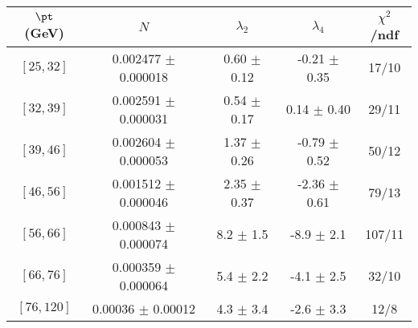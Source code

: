 \begin{tabular}{c||c|c|c|c}
$\pt$ (GeV) & $N$ & $\lambda_{2}$ & $\lambda_4$  & $\chi^2$/ndf  \\
\hline
$[25, 32]$ & 0.002477 $\pm$ 0.000018 & 0.60 $\pm$ 0.12 & -0.21 $\pm$ 0.35 & 17/10\\
$[32, 39]$ & 0.002591 $\pm$ 0.000031 & 0.54 $\pm$ 0.17 & 0.14 $\pm$ 0.40 & 29/11\\
$[39, 46]$ & 0.002604 $\pm$ 0.000053 & 1.37 $\pm$ 0.26 & -0.79 $\pm$ 0.52 & 50/12\\
$[46, 56]$ & 0.001512 $\pm$ 0.000046 & 2.35 $\pm$ 0.37 & -2.36 $\pm$ 0.61 & 79/13\\
$[56, 66]$ & 0.000843 $\pm$ 0.000074 & 8.2 $\pm$ 1.5 & -8.9 $\pm$ 2.1 & 107/11\\
$[66, 76]$ & 0.000359 $\pm$ 0.000064 & 5.4 $\pm$ 2.2 & -4.1 $\pm$ 2.5 & 32/10\\
$[76, 120]$ & 0.00036 $\pm$ 0.00012 & 4.3 $\pm$ 3.4 & -2.6 $\pm$ 3.3 & 12/8\\
\end{tabular}
